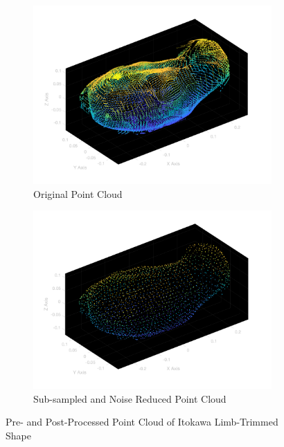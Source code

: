 \begin{figure}[ht!]
    \centering
    \begin{subfigure}[t]{0.4\textwidth}
        \centering
        \includegraphics[width = \textwidth]{fig/dense_itokawa.png}
        \caption{Original Point Cloud}
    \end{subfigure}%
    \begin{subfigure}[t]{0.4\textwidth}
        \centering
        \includegraphics[width = \textwidth]{fig/sparse_itokawa.png}
        \caption{Sub-sampled and Noise Reduced Point Cloud}
    \end{subfigure}
    \caption{Pre- and Post-Processed Point Cloud of Itokawa Limb-Trimmed Shape}
\end{figure}

